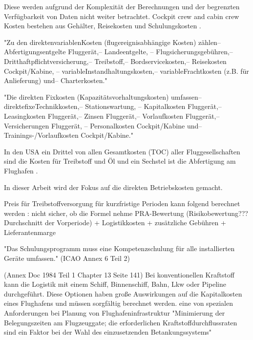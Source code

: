 Diese werden aufgrund der Komplexität der Berechnungen und der begrenzten Verfügbarkeit von Daten nicht weiter betrachtet.
Cockpit crew and cabin crew Kosten bestehen aus Gehälter, Reisekosten und Schulungskosten \cite{conrady2019luftverkehr}.

"Zu den direktenvariablenKosten (flugereignisabhängige Kosten) zählen– Abfertigungsentgelte Fluggerät,– Landeentgelte,
– Flugsicherungsgebühren,– Dritthaftpflichtversicherung,– Treibstoff,– Bordservicekosten,– Reisekosten Cockpit/Kabine,
– variableInstandhaltungskosten,– variableFrachtkosten (z.B. für Anlieferung) und– Charterkosten."

"Die direkten Fixkosten (Kapazitätsvorhaltungskosten) umfassen– direktefixeTechnikkosten,– Stationswartung,
– Kapitalkosten Fluggerät,– Leasingkosten Fluggerät,– Zinsen Fluggerät,– Vorlaufkosten Fluggerät,– Versicherungen Fluggerät,
– Personalkosten Cockpit/Kabine und– Trainings-/Vorlaufkosten Cockpit/Kabine."


In den USA ein Drittel von allen Gesamtkosten (TOC) aller Fluggesellschaften sind die Kosten für Treibstoff und Öl 
und ein Sechstel ist die Abfertigung am Flughafen \cite{conrady2019luftverkehr}. 

In dieser Arbeit wird der Fokus auf die direkten Betriebskosten gemacht.




Preis für Treibstoffversorgung für kurzfristige Perioden kann folgend berechnet werden \cite{iata_saf_procurement_2024}: nicht sicher, ob die Formel nehme
PRA-Bewertung (Risikobewertung??? Durchschnitt der Vorperiode) + Logistikkosten + zusätzliche Gebühren + Lieferantenmarge


"Das Schulungsprogramm muss eine Kompetenzschulung für alle installierten Geräte umfassen." (ICAO Annex 6 Teil 2)

(Annex  Doc 1984 Teil 1 Chapter 13 Seite 141)
Bei konventionellen Kraftstoff kann die Logistik mit einem Schiff, Binnenschiff, Bahn, Lkw oder Pipeline durchgeführt. 
Diese Optionen haben große Auswirkungen auf die Kapitalkosten eines Flughafens und müssen sorgfältig berechnet werden. 
eine von spezialen Anforderungen bei Planung von Flughafeninfrastruktur "Minimierung der Belegungszeiten am Flugzeuggate; 
die erforderlichen Kraftstoffdurchflussraten sind ein Faktor bei der Wahl des einzusetzenden Betankungssystems"

